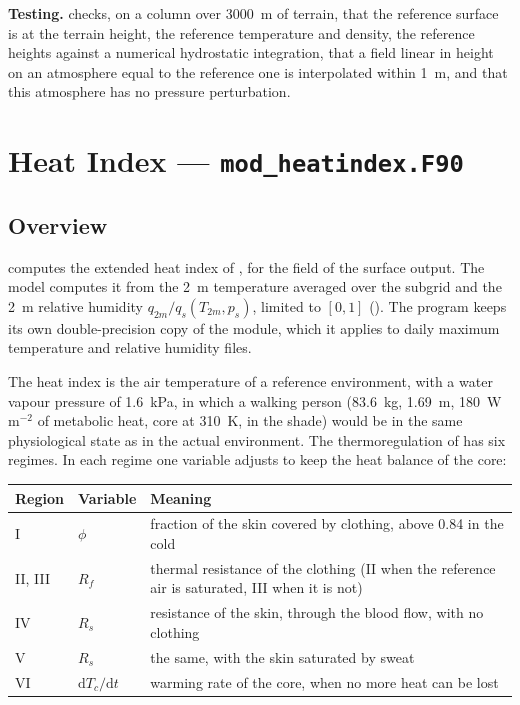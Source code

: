 \textbf{Testing.}  checks, on a
column over 3000~m of terrain, that the reference surface is at the
terrain height, the reference temperature and density, the reference
heights against a numerical hydrostatic integration, that a field linear in
height on an atmosphere equal to the reference one is interpolated within
1~m, and that this atmosphere has no pressure perturbation.

\section{Heat Index --- \texttt{mod\_heatindex.F90}}
\label{sec:heatindex}

\subsection{Overview}

 computes the extended heat index of
\citet{lu2022}, for the  field of the surface output. The
model computes it from the 2~m temperature averaged over the subgrid
and the 2~m relative humidity $q_{2m}/q_s(T_{2m},p_s)$, limited to
$[0,1]$ (). The program
 keeps its own double-precision copy of the
module, which it applies to daily maximum temperature and relative
humidity files.

The heat index is the air temperature of a reference environment, with a
water vapour pressure of 1.6~kPa, in which a walking person (83.6~kg,
1.69~m, 180~W\,m$^{-2}$ of metabolic heat, core at 310~K, in the shade)
would be in the same physiological state as in the actual environment.
The thermoregulation of \citet{lu2022} has six regimes. In each regime one
variable adjusts to keep the heat balance of the core:
\begin{longtable}{L{1.8cm} L{3.6cm} L{8.6cm}}
  \toprule
  \textbf{Region} & \textbf{Variable} & \textbf{Meaning} \\
  \midrule
  \endhead
  \bottomrule
  \endfoot
  I & $\phi$ &
    fraction of the skin covered by clothing, above 0.84 in the cold \\
  II, III & $R_f$ &
    thermal resistance of the clothing (II when the reference air is
    saturated, III when it is not) \\
  IV & $R_s$ &
    resistance of the skin, through the blood flow, with no clothing \\
  V & $R_s$ &
    the same, with the skin saturated by sweat \\
  VI & $\mathrm{d}T_c/\mathrm{d}t$ &
    warming rate of the core, when no more heat can be lost \\
\end{longtable}

